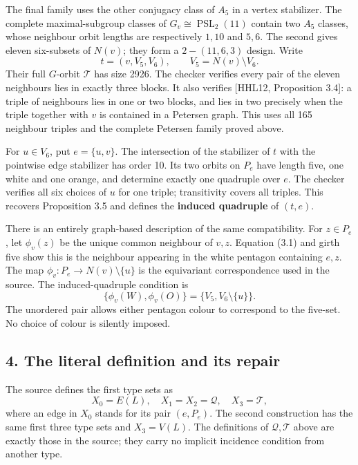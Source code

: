 \documentclass[
  11pt,
  a4paper,
]{article}
\begin{document}
The final family uses the other conjugacy class of \(A_5\) in a vertex
stabilizer. The complete maximal-subgroup classes of
\(G_v\cong\operatorname{PSL}_2(11)\) contain two \(A_5\) classes, whose
neighbour orbit lengths are respectively \(1,10\) and \(5,6\). The
second gives eleven six-subsets of \(N(v)\); they form a
\(2\!-(11,6,3)\) design. Write \[
 t=(v,V_5,V_6),\qquad V_5=N(v)\setminus V_6.
\] Their full \(G\)-orbit \(\mathcal T\) has size 2926. The checker
verifies every pair of the eleven neighbours lies in exactly three
blocks. It also verifies {[}HHL12, Proposition 3.4{]}: a triple of
neighbours lies in one or two blocks, and lies in two precisely when the
triple together with \(v\) is contained in a Petersen graph. This uses
all 165 neighbour triples and the complete Petersen family proved above.

For \(u\in V_6\), put \(e=\{u,v\}\). The intersection of the stabilizer
of \(t\) with the pointwise edge stabilizer has order 10. Its two orbits
on \(P_e\) have length five, one white and one orange, and determine
exactly one quadruple over \(e\). The checker verifies all six choices
of \(u\) for one triple; transitivity covers all triples. This recovers
Proposition 3.5 and defines the \textbf{induced quadruple} of \((t,e)\).

There is an entirely graph-based description of the same compatibility.
For \(z\in P_e\), let \(\phi_v(z)\) be the unique common neighbour of
\(v,z\). Equation (3.1) and girth five show this is the neighbour
appearing in the white pentagon containing \(e,z\). The map
\(\phi_v:P_e\to N(v)\setminus\{u\}\) is the equivariant correspondence
used in the source. The induced-quadruple condition is \[
 \{\phi_v(W),\phi_v(O)\}
    =\{V_5,V_6\setminus\{u\}\}.
 \tag{3.2}
\] The unordered pair allows either pentagon colour to correspond to the
five-set. No choice of colour is silently imposed.

\subsection{4. The literal definition and its
repair}\label{the-literal-definition-and-its-repair}

The source defines the first type sets as \[
 X_0=E(L),\quad X_1=X_2=\mathcal Q,
 \quad X_3=\mathcal T,
\] where an edge in \(X_0\) stands for its pair \((e,P_e)\). The second
construction has the same first three type sets and \(X_3=V(L)\). The
definitions of \(\mathcal Q,\mathcal T\) above are exactly those in the
source; they carry no implicit incidence condition from another type.
\end{document}
